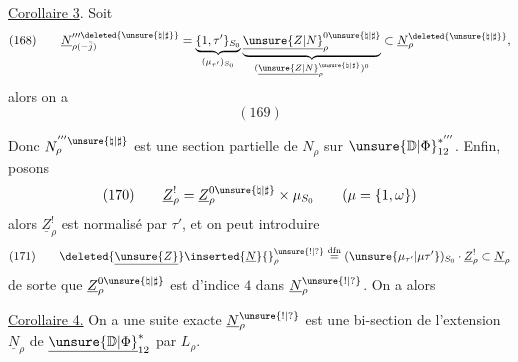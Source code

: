 \uline{Corollaire 3}. Soit
\[
(168)\qquad
\underline N_{\rho(-\bar j)}^{\prime\prime\prime\deleted{\unsure{\natural|\sharp}}}
=\underbrace{\{1,\tau'\}_{S_0}}_{(\mu_{\tau'})_{S_0}}
\underbrace{\underline{\unsure{Z|N}}_\rho^{0\unsure{\natural|\sharp}}}_{(\underline{\unsure{Z|N}}_\rho^{\unsure{\natural|\sharp}})^0}
\subset\underline N_\rho^{\deleted{\unsure{\natural|\sharp}}},
\]
alors on a
\[
(169)
\]


Donc \(N_\rho^{'''\unsure{\natural|\sharp}}\) est une section partielle de \(N_\rho\)
sur \(\unsure{\mathbb D|\Phi}_{12}^{*'''}\). Enfin, posons
\[
(170)\qquad
\underline Z_\rho^{!}
=\underline Z_\rho^{0\unsure{\natural|\sharp}}\times\mu_{S_0}
\qquad(\mu=\{1,\omega\})
\]
alors \(\underline Z_\rho^!\) est normalisé par \(\tau'\), et
on peut introduire
\[
(171)\qquad
\deleted{\underline{\unsure{Z}}}\inserted{\underline N}{}_\rho^{\unsure{!|?}}
\mathrel{\overset{\mathrm{dfn}}{=}}
(\unsure{\mu_{\tau'}|\mu\tau'})_{S_0}\cdot\underline Z_\rho^!
\subset\underline N_\rho
\]
de sorte que \(\underline Z_\rho^{0\unsure{\natural|\sharp}}\) est d'indice \(4\)
dans \(\underline N_\rho^{\unsure{!|?}}\). On a alors

\uline{Corollaire 4.} On a une suite exacte
\(\underline N_\rho^{\unsure{!|?}}\) est une bi-section de l'extension
\(\underline N_\rho\) de \(\underline{\unsure{\mathbb D|\Phi}}_{12}^{*}\) par \(L_\rho\).

